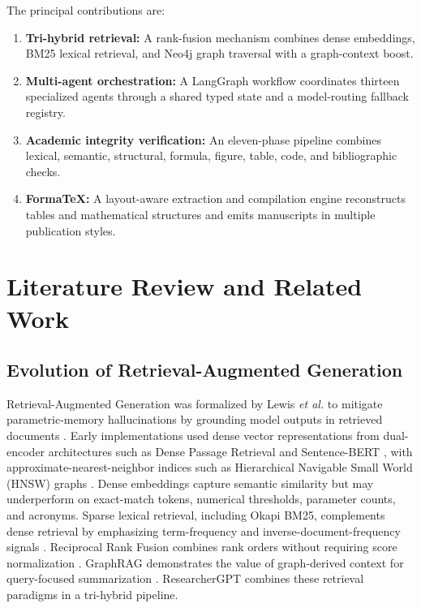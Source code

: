 \documentclass[conference]{IEEEtran}
\begin{document}
The principal contributions are:
\begin{enumerate}
\item \textbf{Tri-hybrid retrieval:} A rank-fusion mechanism combines dense embeddings, BM25 lexical retrieval, and Neo4j graph traversal with a graph-context boost.
\item \textbf{Multi-agent orchestration:} A LangGraph workflow coordinates thirteen specialized agents through a shared typed state and a model-routing fallback registry.
\item \textbf{Academic integrity verification:} An eleven-phase pipeline combines lexical, semantic, structural, formula, figure, table, code, and bibliographic checks.
\item \textbf{FormaTeX:} A layout-aware extraction and compilation engine reconstructs tables and mathematical structures and emits manuscripts in multiple publication styles.
\end{enumerate}
\section{Literature Review and Related Work}
\subsection{Evolution of Retrieval-Augmented Generation}
Retrieval-Augmented Generation was formalized by Lewis \textit{et al.} to mitigate parametric-memory hallucinations by grounding model outputs in retrieved documents \cite{lewis2020rag}. Early implementations used dense vector representations from dual-encoder architectures such as Dense Passage Retrieval and Sentence-BERT \cite{karpukhin2020dpr,reimers2019sbert}, with approximate-nearest-neighbor indices such as Hierarchical Navigable Small World (HNSW) graphs \cite{malkov2020hnsw}.
Dense embeddings capture semantic similarity but may underperform on exact-match tokens, numerical thresholds, parameter counts, and acronyms. Sparse lexical retrieval, including Okapi BM25, complements dense retrieval by emphasizing term-frequency and inverse-document-frequency signals \cite{robertson2009bm25}. Reciprocal Rank Fusion combines rank orders without requiring score normalization \cite{cormack2009rrf}. GraphRAG demonstrates the value of graph-derived context for query-focused summarization \cite{edge2024graphrag}. ResearcherGPT combines these retrieval paradigms in a tri-hybrid pipeline.
\end{document}

